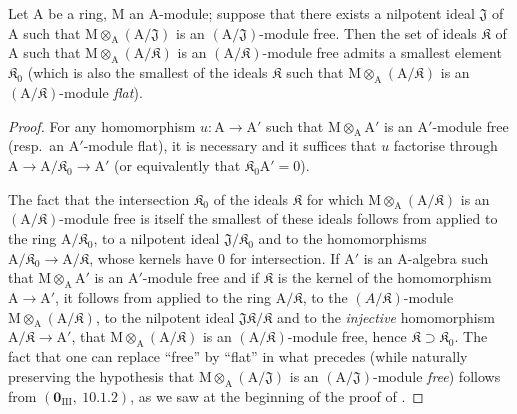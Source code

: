 \begin{corollary}[11.4.4]
\label{IV.11.4.4}
Let $\mathrm{A}$ be a ring, $\mathrm{M}$ an $\mathrm{A}$-module; suppose that there exists
a nilpotent ideal $\mathfrak{J}$ of $\mathrm{A}$ such that $\mathrm{M}\otimes_\mathrm{A}(\mathrm{A}/\mathfrak{J})$ is an $(\mathrm{A}/\mathfrak{J})$-module free. Then the set of
ideals $\mathfrak{K}$ of $\mathrm{A}$ such that $\mathrm{M}\otimes_\mathrm{A}(\mathrm{A}/\mathfrak{K})$ is an $(\mathrm{A}/\mathfrak{K})$-module free admits a smallest element $\mathfrak{K}_0$
(which is also the smallest of the ideals $\mathfrak{K}$ such that $\mathrm{M}\otimes_\mathrm{A}(\mathrm{A}/\mathfrak{K})$ is an $(\mathrm{A}/\mathfrak{K})$-module \emph{flat}).
\end{corollary}

\begin{proof}
For any homomorphism $u:\mathrm{A}\to\mathrm{A}'$ such that $\mathrm{M}\otimes_\mathrm{A}\mathrm{A}'$ is an $\mathrm{A}'$-module free (resp.\ an
$\mathrm{A}'$-module flat), it is necessary and it suffices that $u$ factorise through $\mathrm{A}\to\mathrm{A}/\mathfrak{K}_0\to\mathrm{A}'$ (or equivalently that $\mathfrak{K}_0\mathrm{A}'=0$).

The fact that the intersection $\mathfrak{K}_0$ of the ideals $\mathfrak{K}$ for which $\mathrm{M}\otimes_\mathrm{A}(\mathrm{A}/\mathfrak{K})$ is an
$(\mathrm{A}/\mathfrak{K})$-module free is itself the smallest of these ideals follows from  applied to the
ring $\mathrm{A}/\mathfrak{K}_0$, to a nilpotent ideal $\mathfrak{J}/\mathfrak{K}_0$ and to the homomorphisms $\mathrm{A}/\mathfrak{K}_0\to\mathrm{A}/\mathfrak{K}$,
whose kernels have $0$ for intersection. If $\mathrm{A}'$ is an $\mathrm{A}$-algebra such that $\mathrm{M}\otimes_\mathrm{A}\mathrm{A}'$ is an $\mathrm{A}'$-module free and if $\mathfrak{K}$ is the kernel
of the homomorphism $\mathrm{A}\to\mathrm{A}'$, it follows from  applied to the ring $\mathrm{A}/\mathfrak{K}$, to the
$(A/\mathfrak{K})$-module $\mathrm{M}\otimes_\mathrm{A}(\mathrm{A}/\mathfrak{K})$, to the nilpotent ideal $\mathfrak{J}\mathfrak{K}/\mathfrak{K}$ and to the \emph{injective} homomorphism
$\mathrm{A}/\mathfrak{K}\to\mathrm{A}'$, that $\mathrm{M}\otimes_\mathrm{A}(\mathrm{A}/\mathfrak{K})$ is an $(\mathrm{A}/\mathfrak{K})$-module free, hence $\mathfrak{K}\supset\mathfrak{K}_0$. The fact that
one can replace ``free'' by ``flat'' in what precedes (while naturally preserving
the hypothesis that $\mathrm{M}\otimes_\mathrm{A}(\mathrm{A}/\mathfrak{J})$ is an $(\mathrm{A}/\mathfrak{J})$-module \emph{free}) follows from $(\mathbf{0}_{\mathrm{III}},~10.1.2)$,
as we saw at the beginning of the proof of .
\end{proof}

